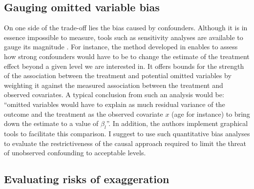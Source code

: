 \documentclass[usletter, 12pt]{article}
\begin{document}
	
		\subsection{Gauging omitted variable bias}
	
			On one side of the trade-off lies the bias caused by confounders. Although it is in essence impossible to measure, tools such as sensitivity analyses are available to gauge its magnitude \citep{rosenbaum_observational_2002, middleton_bias_2016, oster_unobservable_2019, cinelli_making_2020}. For instance, the method developed in \cite{cinelli_making_2020} enables to assess how strong confounders would have to be to change the estimate of the treatment effect beyond a given level we are interested in. It offers bounds for the strength of the association between the treatment and potential omitted variables by weighting it against the measured association between the treatment and observed covariates. A typical conclusion from such an analysis would be: ``omitted variables would have to explain as much residual variance of the outcome and the treatment as the observed covariate $x$ (age for instance) to bring down the estimate to a value of $\beta_{l}$''. In addition, the authors implement graphical tools to facilitate this comparison. I suggest to use such quantitative bias analyses to evaluate the restrictiveness of the causal approach required to limit the threat of unobserved confounding to acceptable levels. 
			
		\subsection{Evaluating risks of exaggeration}
\end{document}
